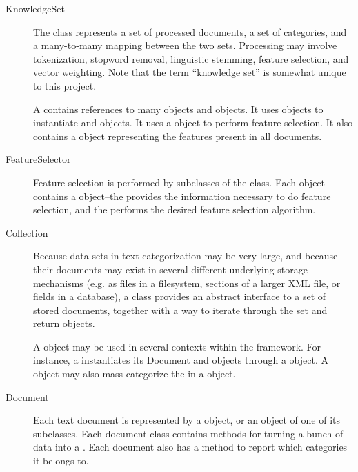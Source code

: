 \documentclass[a4paper]{report}
\begin{document}
\begin{description}

\item[KnowledgeSet]

The  class represents a set of processed documents, a set
of categories, and a many-to-many mapping between the two sets.
Processing may involve tokenization, stopword removal, linguistic
stemming, feature selection, and vector weighting.  Note that the term
``knowledge set'' is somewhat unique to this project.

A  contains references to many  objects and
 objects.  It uses  objects to instantiate 
and  objects.  It uses a  object to perform
feature selection.  It also contains a  object
representing the features present in all documents.

\item[FeatureSelector]

Feature selection is performed by subclasses of the 
class.  Each  object contains a 
object--the  provides the information necessary to do
feature selection, and the  performs the desired
feature selection algorithm.

\item[Collection]

Because data sets in text categorization may be very large, and
because their documents may exist in several different underlying
storage mechanisms (e.g. as files in a filesystem, sections of a
larger XML file, or fields in a database), a  class provides
an abstract interface to a set of stored documents, together with a
way to iterate through the set and return  objects.

A  object may be used in several contexts within the
framework.  For instance, a  instantiates its Document and
 objects through a  object.  A  object may
also mass-categorize the  in a  object.

\item[Document]

Each text document is represented by a  object, or an object
of one of its subclasses.  Each document class contains methods for
turning a bunch of data into a .  Each document also has
a method to report which categories it belongs to.


\end{description}
\end{document}
